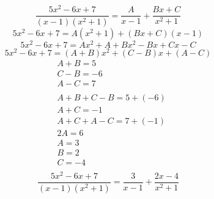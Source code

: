 \documentclass{article}
\begin{document}
\begin{equation*}
    \frac{5x^2 - 6x + 7}{(x-1)(x^2 + 1)}
    =
    \frac{A}{x - 1} + \frac{Bx + C}{x^2 + 1}
\end{equation*}
\begin{equation*}
    5x^2 - 6x + 7
    =
    A (x^2 + 1) + (Bx + C)(x - 1)
\end{equation*}
\begin{equation*}
    5x^2 - 6x + 7
    =
    Ax^2 + A + Bx^2 - Bx + Cx - C
\end{equation*}
\begin{equation*}
    5x^2 - 6x + 7
    =
    (A + B)x^2 + (C - B)x + (A - C)
\end{equation*}
\begin{align*}
    &A + B = 5 \\
    &C - B = -6 \\
    &A - C = 7 \\ \\
    &A + B + C - B = 5 + (-6) \\
    &A + C = -1 \\
    &A + C + A - C = 7 + (-1) \\
    &2A = 6 \\
    &A = 3 \\
    &B = 2 \\
    &C = -4 \\
\end{align*}
\begin{equation*}
    \frac{5x^2 - 6x + 7}{(x-1)(x^2 + 1)}
    =
    \frac{3}{x - 1} + \frac{2x - 4}{x^2 + 1}
\end{equation*}
\end{document}
